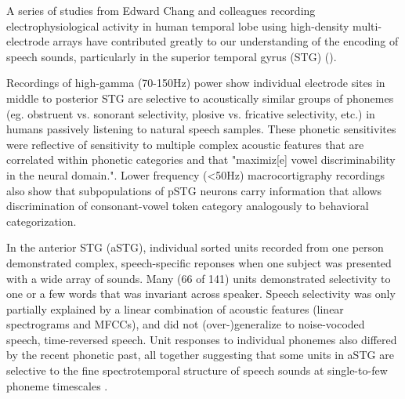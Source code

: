 A series of studies from Edward Chang and colleagues recording electrophysiological activity in human temporal lobe using high-density multi-electrode arrays have contributed greatly to our understanding of the encoding of speech sounds, particularly in the superior temporal gyrus (STG) ()\citep{yiEncodingSpeechSounds2019}. 

Recordings of high-gamma (70-150Hz) power show individual electrode sites in middle to posterior STG are selective to acoustically similar groups of phonemes (eg. obstruent vs. sonorant selectivity, plosive vs. fricative selectivity, etc.) in humans passively listening to natural speech samples\citep{mesgaraniPhoneticFeatureEncoding2014}. These phonetic sensitivites were reflective of sensitivity to multiple complex acoustic features that are correlated within phonetic categories and that "maximiz[e] vowel discriminability in the neural domain."\citep{mesgaraniPhoneticFeatureEncoding2014}. Lower frequency (<50Hz) macrocortigraphy recordings also show that subpopulations of pSTG neurons carry information that allows discrimination of consonant-vowel token category analogously to behavioral categorization\citep{changCategoricalSpeechRepresentation2010b}. 

In the anterior STG (aSTG), individual sorted units recorded from one person demonstrated complex, speech-specific reponses when one subject was presented with a wide array of sounds\citep{chanSpeechSpecificTuningNeurons2014}. Many (66 of 141) units demonstrated selectivity to one or a few words that was invariant across speaker. Speech selectivity was only partially explained by a linear combination of acoustic features (linear spectrograms and MFCCs), and did not (over-)generalize to noise-vocoded speech, time-reversed speech. Unit responses to individual phonemes also differed by the recent phonetic past, all together suggesting that some units in aSTG are selective to the fine spectrotemporal structure of speech sounds at single-to-few phoneme timescales \citep{chanSpeechSpecificTuningNeurons2014}. 

